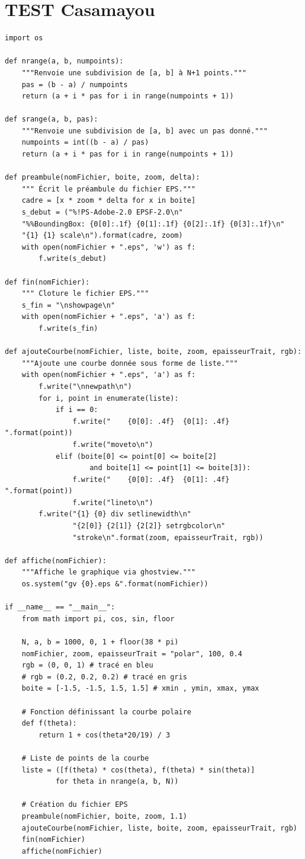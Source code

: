 \documentclass[11pt]{article}
\begin{document}
\section{TEST Casamayou}
\label{sec:org3cc3733}
\begin{verbatim}
import os

def nrange(a, b, numpoints):
    """Renvoie une subdivision de [a, b] à N+1 points."""
    pas = (b - a) / numpoints
    return (a + i * pas for i in range(numpoints + 1))

def srange(a, b, pas):
    """Renvoie une subdivision de [a, b] avec un pas donné."""
    numpoints = int((b - a) / pas)
    return (a + i * pas for i in range(numpoints + 1))

def preambule(nomFichier, boite, zoom, delta):
    """ Écrit le préambule du fichier EPS."""
    cadre = [x * zoom * delta for x in boite]
    s_debut = ("%!PS-Adobe-2.0 EPSF-2.0\n"
    "%%BoundingBox: {0[0]:.1f} {0[1]:.1f} {0[2]:.1f} {0[3]:.1f}\n"
    "{1} {1} scale\n").format(cadre, zoom)
    with open(nomFichier + ".eps", 'w') as f:
        f.write(s_debut)

def fin(nomFichier):
    """ Cloture le fichier EPS."""
    s_fin = "\nshowpage\n"
    with open(nomFichier + ".eps", 'a') as f:
        f.write(s_fin)

def ajouteCourbe(nomFichier, liste, boite, zoom, epaisseurTrait, rgb):
    """Ajoute une courbe donnée sous forme de liste."""
    with open(nomFichier + ".eps", 'a') as f:
        f.write("\nnewpath\n")
        for i, point in enumerate(liste):
            if i == 0:
                f.write("    {0[0]: .4f}  {0[1]: .4f}   ".format(point))
                f.write("moveto\n")
            elif (boite[0] <= point[0] <= boite[2]
                    and boite[1] <= point[1] <= boite[3]):
                f.write("    {0[0]: .4f}  {0[1]: .4f}   ".format(point))
                f.write("lineto\n")
        f.write("{1} {0} div setlinewidth\n"
                "{2[0]} {2[1]} {2[2]} setrgbcolor\n"
                "stroke\n".format(zoom, epaisseurTrait, rgb))

def affiche(nomFichier):
    """Affiche le graphique via ghostview."""
    os.system("gv {0}.eps &".format(nomFichier))

if __name__ == "__main__":
    from math import pi, cos, sin, floor

    N, a, b = 1000, 0, 1 + floor(38 * pi)
    nomFichier, zoom, epaisseurTrait = "polar", 100, 0.4
    rgb = (0, 0, 1) # tracé en bleu
    # rgb = (0.2, 0.2, 0.2) # tracé en gris
    boite = [-1.5, -1.5, 1.5, 1.5] # xmin , ymin, xmax, ymax

    # Fonction définissant la courbe polaire
    def f(theta):
        return 1 + cos(theta*20/19) / 3

    # Liste de points de la courbe
    liste = ([f(theta) * cos(theta), f(theta) * sin(theta)]
            for theta in nrange(a, b, N))

    # Création du fichier EPS
    preambule(nomFichier, boite, zoom, 1.1)
    ajouteCourbe(nomFichier, liste, boite, zoom, epaisseurTrait, rgb)
    fin(nomFichier)
    affiche(nomFichier)
\end{verbatim}
\end{document}

